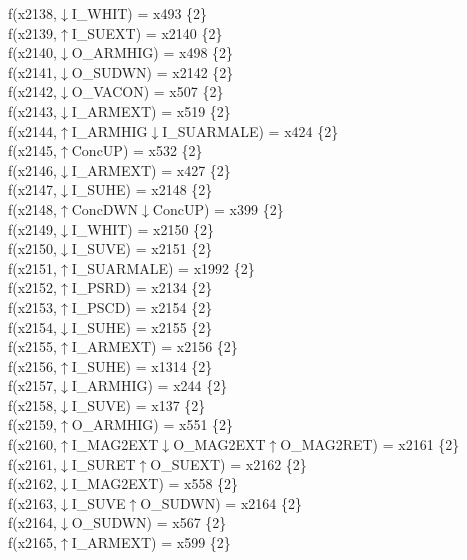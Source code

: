 f(x2138,$\downarrow$I\_WHIT) = x493 \{2\} \\  
f(x2139,$\uparrow$I\_SUEXT) = x2140 \{2\} \\  
f(x2140,$\downarrow$O\_ARMHIG) = x498 \{2\} \\  
f(x2141,$\downarrow$O\_SUDWN) = x2142 \{2\} \\  
f(x2142,$\downarrow$O\_VACON) = x507 \{2\} \\  
f(x2143,$\downarrow$I\_ARMEXT) = x519 \{2\} \\  
f(x2144,$\uparrow$I\_ARMHIG$\downarrow$I\_SUARMALE) = x424 \{2\} \\  
f(x2145,$\uparrow$ConcUP) = x532 \{2\} \\  
f(x2146,$\downarrow$I\_ARMEXT) = x427 \{2\} \\  
f(x2147,$\downarrow$I\_SUHE) = x2148 \{2\} \\  
f(x2148,$\uparrow$ConcDWN$\downarrow$ConcUP) = x399 \{2\} \\  
f(x2149,$\downarrow$I\_WHIT) = x2150 \{2\} \\  
f(x2150,$\downarrow$I\_SUVE) = x2151 \{2\} \\  
f(x2151,$\uparrow$I\_SUARMALE) = x1992 \{2\} \\  
f(x2152,$\uparrow$I\_PSRD) = x2134 \{2\} \\  
f(x2153,$\uparrow$I\_PSCD) = x2154 \{2\} \\  
f(x2154,$\downarrow$I\_SUHE) = x2155 \{2\} \\  
f(x2155,$\uparrow$I\_ARMEXT) = x2156 \{2\} \\  
f(x2156,$\uparrow$I\_SUHE) = x1314 \{2\} \\  
f(x2157,$\downarrow$I\_ARMHIG) = x244 \{2\} \\  
f(x2158,$\downarrow$I\_SUVE) = x137 \{2\} \\  
f(x2159,$\uparrow$O\_ARMHIG) = x551 \{2\} \\  
f(x2160,$\uparrow$I\_MAG2EXT$\downarrow$O\_MAG2EXT$\uparrow$O\_MAG2RET) = x2161 \{2\} \\  
f(x2161,$\downarrow$I\_SURET$\uparrow$O\_SUEXT) = x2162 \{2\} \\  
f(x2162,$\downarrow$I\_MAG2EXT) = x558 \{2\} \\  
f(x2163,$\downarrow$I\_SUVE$\uparrow$O\_SUDWN) = x2164 \{2\} \\  
f(x2164,$\downarrow$O\_SUDWN) = x567 \{2\} \\  
f(x2165,$\uparrow$I\_ARMEXT) = x599 \{2\} \\  
